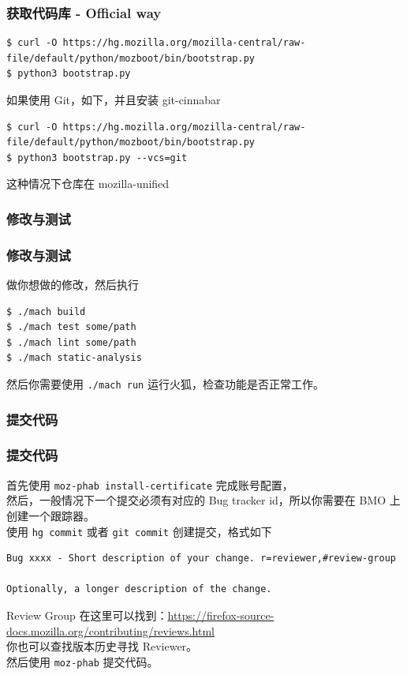 \documentclass[UTF-8]{ctexbeamer}
\begin{document}
\begin{frame}[fragile]
	\frametitle{获取代码库 - Official way}

	\begin{verbatim}
$ curl -O https://hg.mozilla.org/mozilla-central/raw-file/default/python/mozboot/bin/bootstrap.py
$ python3 bootstrap.py
	\end{verbatim}
	如果使用 Git，如下，并且安装 git-cinnabar
	\begin{verbatim}
$ curl -O https://hg.mozilla.org/mozilla-central/raw-file/default/python/mozboot/bin/bootstrap.py
$ python3 bootstrap.py --vcs=git
	\end{verbatim}
	这种情况下仓库在 mozilla-unified

\end{frame}

\subsubsection{修改与测试}
\begin{frame}[fragile]
	\frametitle{修改与测试}
	做你想做的修改，然后执行
	\begin{verbatim}
$ ./mach build
$ ./mach test some/path
$ ./mach lint some/path
$ ./mach static-analysis
	\end{verbatim}
	然后你需要使用 \verb|./mach run| 运行火狐，检查功能是否正常工作。
\end{frame}

\subsubsection{提交代码}
\begin{frame}[fragile]
	\frametitle{提交代码}

	首先使用 \verb|moz-phab install-certificate| 完成账号配置，\\
	然后，一般情况下一个提交必须有对应的 Bug tracker id，所以你需要在 BMO 上创建一个跟踪器。\\
	使用 \verb|hg commit| 或者 \verb|git commit| 创建提交，格式如下\\
	\begin{verbatim}
Bug xxxx - Short description of your change. r=reviewer,#review-group

Optionally, a longer description of the change.
	\end{verbatim}
	Review Group 在这里可以找到：\url{https://firefox-source-docs.mozilla.org/contributing/reviews.html} \\
	你也可以查找版本历史寻找 Reviewer。\\
	然后使用 \verb|moz-phab| 提交代码。

\end{frame}
\end{document}
